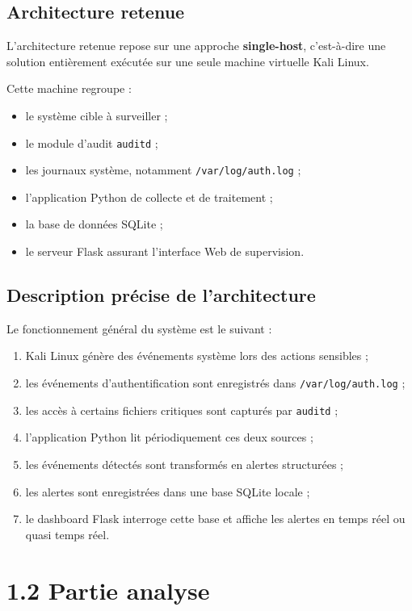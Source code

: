 \documentclass[12pt,a4paper]{article}
\begin{document}
\subsection{Architecture retenue}

L’architecture retenue repose sur une approche \textbf{single-host}, c’est-à-dire une solution entièrement exécutée sur une seule machine virtuelle Kali Linux.

Cette machine regroupe :
\begin{itemize}
    \item le système cible à surveiller ;
    \item le module d’audit \texttt{auditd} ;
    \item les journaux système, notamment \texttt{/var/log/auth.log} ;
    \item l’application Python de collecte et de traitement ;
    \item la base de données SQLite ;
    \item le serveur Flask assurant l’interface Web de supervision.
\end{itemize}

\subsection{Description précise de l’architecture}

Le fonctionnement général du système est le suivant :
\begin{enumerate}
    \item Kali Linux génère des événements système lors des actions sensibles ;
    \item les événements d’authentification sont enregistrés dans \texttt{/var/log/auth.log} ;
    \item les accès à certains fichiers critiques sont capturés par \texttt{auditd} ;
    \item l’application Python lit périodiquement ces deux sources ;
    \item les événements détectés sont transformés en alertes structurées ;
    \item les alertes sont enregistrées dans une base SQLite locale ;
    \item le dashboard Flask interroge cette base et affiche les alertes en temps réel ou quasi temps réel.
\end{enumerate}
\section{1.2 Partie analyse}
\end{document}
